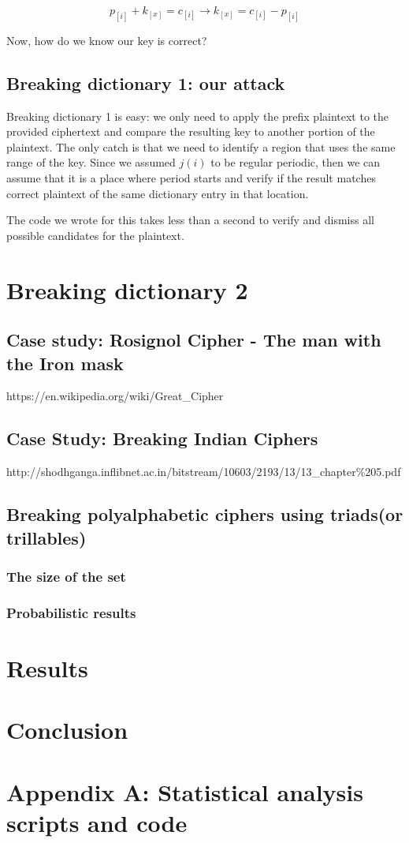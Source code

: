 \documentclass[pdftex,12pt,letter]{article}
\begin{document}
\begin{equation}
    p_{[i]} + k_{[x]} = c_{[i]} \rightarrow k_{[x]} = c_{[i]} - p_{[i]}
\end{equation}

Now, how do we know our key is correct?

\subsection{Breaking dictionary 1: our attack}

Breaking dictionary 1 is easy: we only need to apply the prefix plaintext to
the provided ciphertext and compare the resulting  key to another portion of
the plaintext. The only catch is that we need to identify a region that uses
the same range of the key. Since we assumed $j(i)$ to be regular periodic, then
we can assume that it is a place where period starts and verify if the result
matches correct plaintext of the same dictionary entry in that location. 

The code we wrote for this takes less than a second to verify and dismiss all
possible candidates for the plaintext. 



\section{Breaking dictionary 2}

\subsection{Case study: Rosignol Cipher - The man with the Iron mask}
https://en.wikipedia.org/wiki/Great\_Cipher

\subsection{Case Study: Breaking Indian Ciphers}
http://shodhganga.inflibnet.ac.in/bitstream/10603/2193/13/13\_chapter\%205.pdf

\subsection{Breaking polyalphabetic ciphers using triads(or trillables)}

\subsubsection{The size of the set}

\subsubsection{Probabilistic results}

\section{Results}

\section{Conclusion}

\newpage
\appendix{}
\section*{Appendix A: Statistical analysis scripts and code}
\end{document}
